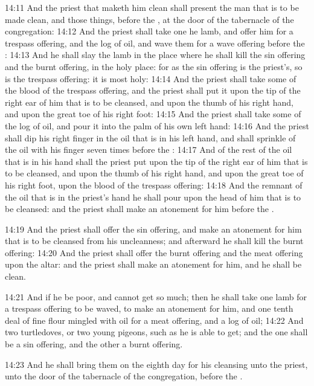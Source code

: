 14:11 And the priest that maketh him clean shall present the man that
is to be made clean, and those things, before the \LORD, at the door of
the tabernacle of the congregation: 14:12 And the priest shall take
one he lamb, and offer him for a trespass offering, and the log of
oil, and wave them for a wave offering before the \LORD: 14:13 And he
shall slay the lamb in the place where he shall kill the sin offering
and the burnt offering, in the holy place: for as the sin offering is
the priest's, so is the trespass offering: it is most holy: 14:14 And
the priest shall take some of the blood of the trespass offering, and
the priest shall put it upon the tip of the right ear of him that is
to be cleansed, and upon the thumb of his right hand, and upon the
great toe of his right foot: 14:15 And the priest shall take some of
the log of oil, and pour it into the palm of his own left hand: 14:16
And the priest shall dip his right finger in the oil that is in his
left hand, and shall sprinkle of the oil with his finger seven times
before the \LORD: 14:17 And of the rest of the oil that is in his hand
shall the priest put upon the tip of the right ear of him that is to
be cleansed, and upon the thumb of his right hand, and upon the great
toe of his right foot, upon the blood of the trespass offering: 14:18
And the remnant of the oil that is in the priest's hand he shall pour
upon the head of him that is to be cleansed: and the priest shall make
an atonement for him before the \LORD.

14:19 And the priest shall offer the sin offering, and make an
atonement for him that is to be cleansed from his uncleanness; and
afterward he shall kill the burnt offering: 14:20 And the priest shall
offer the burnt offering and the meat offering upon the altar: and the
priest shall make an atonement for him, and he shall be clean.

14:21 And if he be poor, and cannot get so much; then he shall take
one lamb for a trespass offering to be waved, to make an atonement for
him, and one tenth deal of fine flour mingled with oil for a meat
offering, and a log of oil; 14:22 And two turtledoves, or two young
pigeons, such as he is able to get; and the one shall be a sin
offering, and the other a burnt offering.

14:23 And he shall bring them on the eighth day for his cleansing unto
the priest, unto the door of the tabernacle of the congregation,
before the \LORD.

